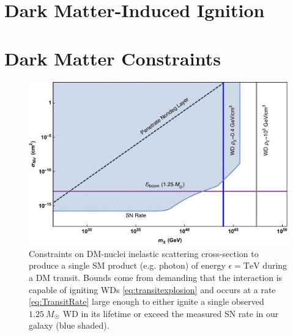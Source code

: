 \documentclass[preprintnumbers,amsmath,amssymb,prd,superscriptaddress]{revtex4}
\begin{document}
\section{Dark Matter-Induced Ignition}
\label{sec:dmignition}


\section{Dark Matter Constraints}
\label{sec:constraints}


\begin{figure}
\includegraphics[scale=.35]{transitobservation.pdf}
\caption{Constraints on DM-nuclei inelastic scattering cross-section to produce a single SM product (e.g. photon) of energy $\epsilon = \text{TeV}$ during a DM transit. 
Bounds come from demanding that the interaction is capable of igniting WDs \eqref{eq:transitexplosion} and occurs at a rate \eqref{eq:TransitRate} large enough to either ignite a single observed $1.25~M_{\astrosun}$ WD in its lifetime or exceed the measured SN rate in our galaxy (blue shaded).}
\label{fig:transit-inelastic}
\end{figure}
\end{document}

